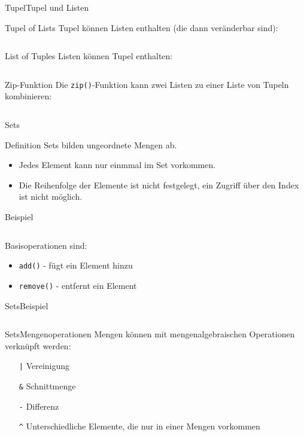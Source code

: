 \documentclass[xelatex,aspectratio=169]{beamer}
\begin{document}
\begin{frame}{Tupel}{Tupel und Listen}
    \begin{block}{Tupel of Lists}
        Tupel können Listen enthalten (die dann veränderbar sind):
        \inputminted[lastline=1]{python}{src/tupel_und_listen.py}
    \end{block}
    \begin{block}{List of Tuples}
        Listen können Tupel enthalten:
        \inputminted[firstline=4,lastline=4]{python}{src/tupel_und_listen.py}
    \end{block}
    \begin{block}{Zip-Funktion}
        Die \texttt{zip()}-Funktion kann zwei Listen zu einer Liste von Tupeln kombinieren:
        \inputminted[firstline=7,lastline=7]{python}{src/tupel_und_listen.py}
    \end{block}
\end{frame}

\begin{frame}{Sets}
    \begin{block}{Definition}
        Sets bilden ungeordnete Mengen ab.
        \begin{itemize}
            \item Jedes Element kann nur einmmal im Set vorkommen.
            \item Die Reihenfolge der Elemente ist nicht festgelegt, ein Zugriff über den Index ist nicht möglich.
        \end{itemize}

    \end{block}
    \begin{exampleblock}{Beispiel}
        \inputminted{python}{src/sets_overview.py}
    \end{exampleblock}

    Basisoperationen sind:
    \begin{itemize}
        \item \texttt{add()} - fügt ein Element hinzu
        \item \texttt{remove()} - entfernt ein Element
    \end{itemize}

\end{frame}

\begin{frame}{Sets}{Beispiel}
    \inputminted{python}{src/sets_example.py}
\end{frame}

\begin{frame}{Sets}{Mengenoperationen}
    Mengen können mit mengenalgebraischen Operationen verknüpft werden:
    \begin{itemize}
        \item [\texttt{|}] Vereinigung
        \item [\texttt{\&}] Schnittmenge
        \item [\texttt{-}] Differenz
        \item [\texttt{\^}] Unterschiedliche Elemente, die nur in einer Mengen vorkommen
    \end{itemize}

    \inputminted[lastline=7]{python}{src/sets_operations.py}

\end{frame}
\end{document}
